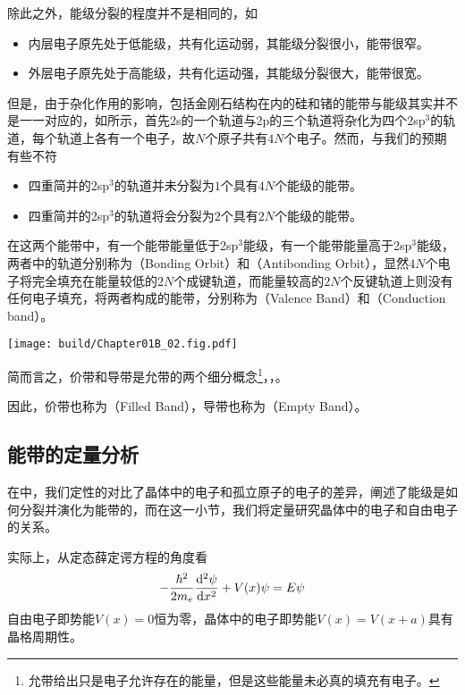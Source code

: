 除此之外，能级分裂的程度并不是相同的，如
\begin{itemize}
    \item 内层电子原先处于低能级，共有化运动弱，其能级分裂很小，能带很窄。
    \item 外层电子原先处于高能级，共有化运动强，其能级分裂很大，能带很宽。
\end{itemize}

但是，由于杂化作用的影响，包括金刚石结构在内的硅和锗的能带与能级其实并不是一一对应的，如所示，首先2s的一个轨道与2p的三个轨道将杂化为四个2sp$^3$的轨道，每个轨道上各有一个电子，故$N$个原子共有$4N$个电子。然而，与我们的预期有些不符
\begin{itemize}
    \item 四重简并的2sp$^3$的轨道并未分裂为$1$个具有$4N$个能级的能带。
    \item 四重简并的2sp$^3$的轨道将会分裂为$2$个具有$2N$个能级的能带。
\end{itemize}
在这两个能带中，有一个能带能量低于2sp$^3$能级，有一个能带能量高于2sp$^3$能级，两者中的轨道分别称为（Bonding Orbit）和（Antibonding Orbit），显然$4N$个电子将完全填充在能量较低的$2N$个成键轨道，而能量较高的$2N$个反键轨道上则没有任何电子填充，将两者构成的能带，分别称为（Valence Band）和（Conduction band）。\cite{W2}

\begin{Figure}[能级分裂与能带]
    \texttt{[image: build/Chapter01B\_02.fig.pdf]}
\end{Figure}

简而言之，价带和导带是允带的两个细分概念\footnote{允带给出只是电子允许存在的能量，但是这些能量未必真的填充有电子。}，，。

因此，价带也称为（Filled Band），导带也称为（Empty Band）。

\subsection{能带的定量分析}
在中，我们定性的对比了晶体中的电子和孤立原子的电子的差异，阐述了能级是如何分裂并演化为能带的，而在这一小节，我们将定量研究晶体中的电子和自由电子的关系。

实际上，从定态薛定谔方程的角度看
\begin{eqnarray}
    -\frac{\hbar^2}{2m_e}\dv[2]{\psi}{x}+V(x)\psi=E\psi
\end{eqnarray}
自由电子即势能$V(x)=0$恒为零，晶体中的电子即势能$V(x)=V(x+a)$具有晶格周期性。

